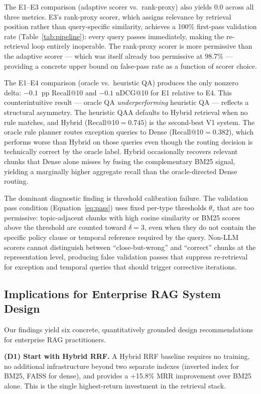 \documentclass[11pt, a4paper]{article}
\begin{document}
The E1--E3 comparison (adaptive scorer vs.\ rank-proxy) also yields 0.0 across all three metrics. E3's rank-proxy scorer, which assigns relevance by retrieval position rather than query-specific similarity, achieves a 100\% first-pass validation rate (Table~\ref{tab:pipeline}): every query passes immediately, making the re-retrieval loop entirely inoperable. The rank-proxy scorer is more permissive than the adaptive scorer --- which was itself already too permissive at 98.7\% --- providing a concrete upper bound on false-pass rate as a function of scorer choice.

The E1--E4 comparison (oracle vs.\ heuristic QA) produces the only nonzero delta: $-0.1$~pp Recall@10 and $-0.1$ nDCG@10 for E1 relative to E4. This counterintuitive result --- oracle QA \textit{underperforming} heuristic QA --- reflects a structural asymmetry. The heuristic QAA defaults to Hybrid retrieval when no rule matches, and Hybrid (Recall@10$={0.745}$) is the second-best V1 system. The oracle rule planner routes exception queries to Dense (Recall@10$={0.382}$), which performs worse than Hybrid on those queries even though the routing decision is technically correct by the oracle label. Hybrid occasionally recovers relevant chunks that Dense alone misses by fusing the complementary BM25 signal, yielding a marginally higher aggregate recall than the oracle-directed Dense routing.

The dominant diagnostic finding is threshold calibration failure. The validation pass condition (Equation~\ref{eq:pass}) uses fixed per-type thresholds $\theta_\tau$ that are too permissive: topic-adjacent chunks with high cosine similarity or BM25 scores above the threshold are counted toward $\delta=3$, even when they do not contain the specific policy clause or temporal reference required by the query. Non-LLM scorers cannot distinguish between ``close-but-wrong'' and ``correct'' chunks at the representation level, producing false validation passes that suppress re-retrieval for exception and temporal queries that should trigger corrective iterations.

\subsection{Implications for Enterprise RAG System Design}

Our findings yield six concrete, quantitatively grounded design recommendations for enterprise RAG practitioners.

\textbf{(D1) Start with Hybrid RRF.} A Hybrid RRF baseline requires no training, no additional infrastructure beyond two separate indexes (inverted index for BM25, FAISS for dense), and provides a +15.8\% MRR improvement over BM25 alone. This is the single highest-return investment in the retrieval stack.
\end{document}
